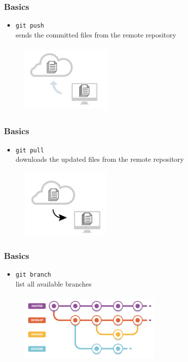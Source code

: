 \documentclass{beamer}
\begin{document}
\begin{frame}[fragile]
\frametitle{Basics}
\begin{itemize}
\item \verb!git push! \\
sends the committed files from the remote repository
\end{itemize}
\begin{figure}
\centering
\includegraphics[height=3.5cm, width=4.5cm]{push}
\end{figure}
\end{frame}

\begin{frame}[fragile]
\frametitle{Basics}
\begin{itemize}
\item \verb!git pull! \\
downloads the updated files from the remote repository
\end{itemize}
\begin{figure}
\centering
\includegraphics[height=3.5cm, width=4.5cm]{pull}
\end{figure}
\end{frame}

\begin{frame}[fragile]
\frametitle{Basics}
\begin{itemize}
\item \verb!git branch! \\
list all available branches
\end{itemize}
\begin{figure}
\centering
\includegraphics[height=3.5cm, width=7cm]{branching}
\end{figure}
\end{frame}
\end{document}
